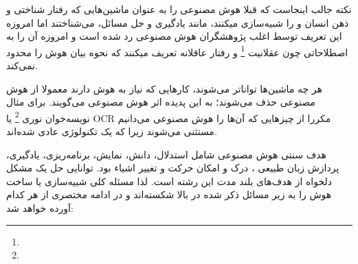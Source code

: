 \documentclass[a4paper, 12pt]{article}
\begin{document}
 نکته جالب اینجاست که قبلا هوش مصنوعی را به عنوان ماشین‌هایی که رفتار شناختی و ذهن انسان و را شبیه‌سازی میکنند، مانند یادگیری و حل مسائل، می‌شناختند اما امروزه این تعریف توسط اغلب پژوهشگران هوش مصنوعی رد شده است و امروزه آن را به اصطلاحاتی چون عقلانیت
 \footnote{}
 و رفتار عاقلانه تعریف میکنند که نحوه بیان هوش را محدود نمی‌کند.
 
  هر چه ماشین‌ها تواناتر می‌شوند، کارهایی که نیاز به هوش دارند معمولا از هوش مصنوعی حذف می‌شوند؛ به این پدیده اثر هوش مصنوعی می‌گویند. برای مثال نویسه‌خوان نوری
  \footnote{}
   یا OCR مکررا از چیز‌هایی که آن‌ها را هوش مصنوعی می‌دانیم مستثنی می‌شوند زیرا که یک تکنولوژی عادی شده‌اند.  
   
   
   هدف سنتی هوش مصنوعی شامل استدلال، دانش، نمایش، برنامه‌ریزی، یادگیری، پردازش زبان طبیعی ، درک و امکان حرکت و تغییر اشیاء بود. توانایی حل یک مشکل دلخواه از هدف‌های بلند مدت این رشته است. لذا مسئله کلی شبیه‌سازی یا ساخت هوش را به زیر مسائل ذکر شده در بالا شکسته‌اند و در ادامه مختصری از هر کدام آورده خواهد شد:
\end{document}
